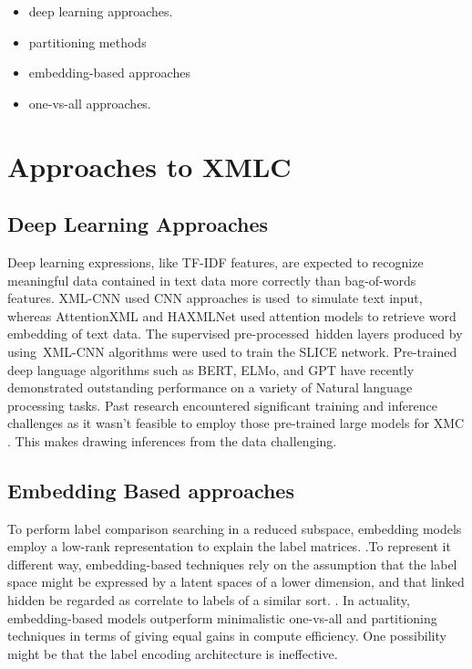 \documentclass[a4paper]{article}
\begin{document}
\begin{itemize}
    \item deep learning approaches.
    \item partitioning methods
    \item embedding-based approaches
    \item one-vs-all approaches.
\end{itemize}

\section{Approaches to XMLC}
\subsection{Deep Learning Approaches}

Deep learning expressions, like TF-IDF features, are expected to recognize meaningful data contained in text data more correctly than bag-of-words features. XML-CNN used CNN approaches is used to simulate text input, whereas AttentionXML and HAXMLNet used attention models to retrieve word embedding of text data. The supervised pre-processed hidden layers produced by using XML-CNN algorithms were used to train the SLICE network. Pre-trained deep language algorithms such as BERT, ELMo, and GPT have recently demonstrated outstanding performance on a variety of Natural language processing tasks. Past research encountered significant training and inference challenges as it wasn't feasible to employ those pre-trained large models for XMC \cite{bib3}. This makes drawing inferences from the data challenging.

\subsection{Embedding Based approaches}
To perform label comparison searching in a reduced subspace, embedding models employ a low-rank representation to explain the label matrices. \cite{bib6}.To represent it different way, embedding-based techniques rely on the assumption that the label space might be expressed by a latent spaces of a lower dimension, and that linked hidden be regarded as correlate to labels of a similar sort. \cite{bib5}. In actuality, embedding-based models outperform minimalistic one-vs-all and partitioning techniques in terms of giving equal gains in compute efficiency. One possibility might be that the label encoding architecture is ineffective.
\end{document}
